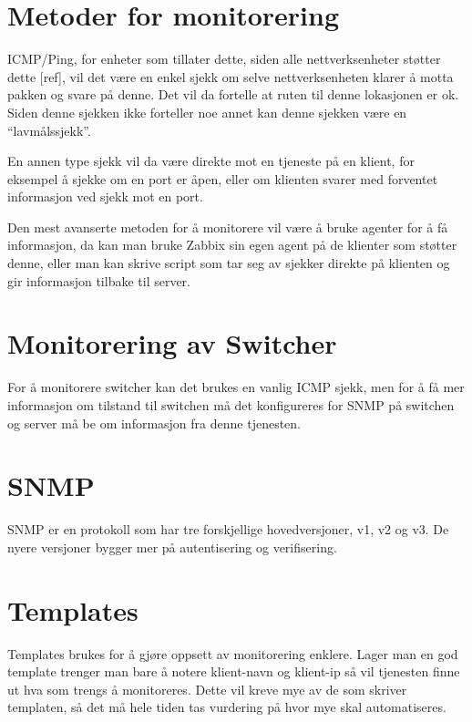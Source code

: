 \section{Metoder for monitorering}
ICMP/Ping, for enheter som tillater dette, siden alle nettverksenheter støtter dette [ref], vil det være en enkel sjekk om selve nettverksenheten klarer å motta pakken og svare på denne. Det vil da fortelle at ruten til denne lokasjonen er ok. Siden denne sjekken ikke forteller noe annet kan denne sjekken være en “lavmålssjekk”.

En annen type sjekk vil da være direkte mot en tjeneste på en klient, for eksempel å sjekke om en port er åpen, eller om klienten svarer med forventet informasjon ved sjekk mot en port.

Den mest avanserte metoden for å monitorere vil være å bruke agenter for å få informasjon, da kan man bruke Zabbix sin egen agent på de klienter som støtter denne, eller man kan skrive script som tar seg av sjekker direkte på klienten og gir informasjon tilbake til server.




\section{Monitorering av Switcher}
For å monitorere switcher kan det brukes en vanlig ICMP sjekk, men for å få mer informasjon om tilstand til switchen må det konfigureres for SNMP på switchen og server må be om informasjon fra denne tjenesten.



\section{SNMP}
SNMP er en protokoll som har tre forskjellige hovedversjoner, v1, v2 og v3. De nyere versjoner bygger mer på autentisering og verifisering.



\section{Templates}
Templates brukes for å gjøre oppsett av monitorering enklere. Lager man en god template trenger man bare å notere klient-navn og klient-ip så vil tjenesten finne ut hva som trengs å monitoreres. Dette vil kreve mye av de som skriver templaten, så det må hele tiden tas vurdering på hvor mye skal automatiseres.




